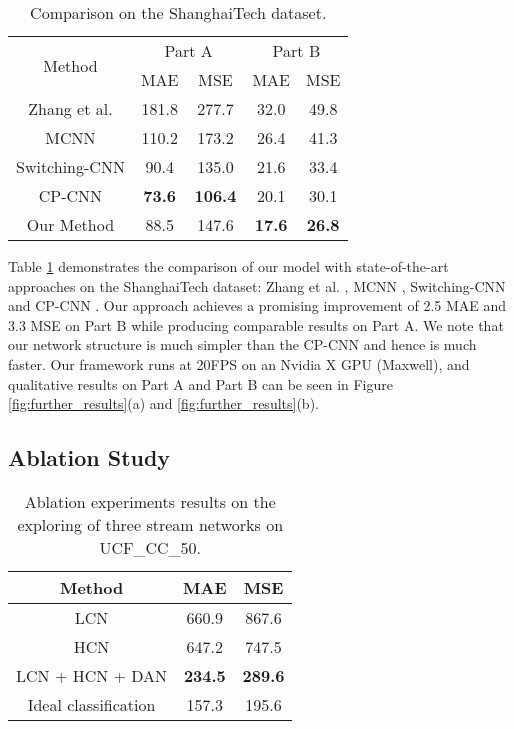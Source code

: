 \documentclass[journal]{IEEEtran}
\begin{document}
\begin{table}
\begin{center}
\caption{Comparison on the ShanghaiTech dataset.}
\label{tab:shanghaitech}
\begin{tabular}{c|cc|cc }
\hline
\multirow{2}{*}{Method} &\multicolumn{2}{c|}{Part A}&\multicolumn{2}{c}{Part B}\\
\cline{2-5}
&MAE&MSE&MAE&MSE\\
  \hline
  \hline
  Zhang et al. \cite{Zhang:2015id} &	 181.8  &  277.7  &  32.0  &  49.8  \\
  \hline
  MCNN \cite{Zhang:2016fr} &	110.2   &  173.2  & 26.4   & 41.3   \\
  \hline
  Switching-CNN \cite{sam2017switching} &	90.4   & 135.0   &  21.6  &  33.4  \\
  \hline
  CP-CNN \cite{Sindagi:2017vv} &	\textbf{73.6}  &  \textbf{106.4}  &  20.1  &  30.1  \\
  \hline
  Our Method  &	 88.5  &  147.6  &  \textbf{17.6}  &  \textbf{26.8}  \\
  \hline
\end{tabular}
\end{center}
\vspace{-0.15in}
\end{table}

Table \ref{tab:shanghaitech} demonstrates the comparison of our model with state-of-the-art approaches on the ShanghaiTech dataset: Zhang et al. \cite{Zhang:2015id}, MCNN \cite{Zhang:2016fr}, Switching-CNN \cite{sam2017switching} and CP-CNN \cite{Sindagi:2017vv}. Our approach achieves a promising improvement of 2.5 MAE and 3.3 MSE on Part B while producing comparable results on Part A. We note that our network structure is much simpler than the CP-CNN and hence is much faster.
Our framework runs at 20FPS on an Nvidia X GPU (Maxwell), and qualitative results on Part A and Part B can be seen in Figure \ref{fig:further_results}(a) and \ref{fig:further_results}(b).

\subsection{Ablation Study}

\begin{table}
\begin{center}
\caption{Ablation experiments results on the exploring of three stream networks on UCF\_CC\_50.}
\label{tab:networks}
\begin{tabular}{c|cc}
\hline
Method &MAE&MSE\\
  \hline
  \hline
    LCN   &	660.9   &  867.6    \\
  \hline
  HCN   &	647.2  &  747.5   \\
  \hline
  LCN + HCN + DAN  &	\textbf{234.5}   &  \textbf{289.6} \\
  \hline\hline
  Ideal classification & 157.3  &  195.6 \\
  \hline
\end{tabular}
\end{center}
\vspace{-0.15in}
\end{table}
\end{document}

